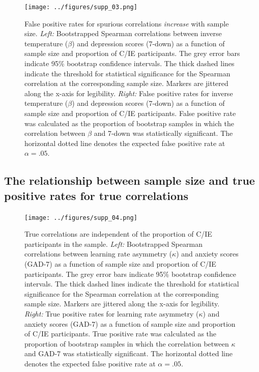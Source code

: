 \documentclass[a4paper,notitlepage,12pt]{article}
\begin{document}
\begin{refsection}[supp]
\begin{figure}[H]
\texttt{[image: ../figures/supp\_03.png]}
\centering
\captionsetup{width=0.88\textwidth}
\caption{False positive rates for spurious correlations \emph{increase} with sample size. \textit{Left:} Bootstrapped Spearman correlations between inverse temperature ($\beta$) and depression scores (7-down) as a function of sample size and proportion of C/IE participants. The grey error bars indicate 95\% bootstrap confidence intervals. The thick dashed lines indicate the threshold for statistical significance for the Spearman correlation at the corresponding sample size. Markers are jittered along the x-axis for legibility. \textit{Right:} False positive rates for inverse temperature ($\beta$) and depression scores (7-down) as a function of sample size and proportion of C/IE participants. False positive rate was calculated as the proportion of bootstrap samples in which the correlation between $\beta$ and 7-down was statistically significant. The horizontal dotted line denotes the expected false positive rate at $\alpha = .05$.}
\label{fig:bootstrap_s1}
\end{figure}

\clearpage

\subsection*{The relationship between sample size and true positive rates for true correlations}

\begin{figure}[H]
\texttt{[image: ../figures/supp\_04.png]}
\centering
\captionsetup{width=0.88\textwidth}
\caption{True correlations are independent of the proportion of C/IE participants in the sample. \textit{Left:} Bootstrapped Spearman correlations between learning rate asymmetry ($\kappa$) and anxiety scores (GAD-7) as a function of sample size and proportion of C/IE participants. The grey error bars indicate 95\% bootstrap confidence intervals. The thick dashed lines indicate the threshold for statistical significance for the Spearman correlation at the corresponding sample size. Markers are jittered along the x-axis for legibility. \textit{Right:} True positive rates for learning rate asymmetry ($\kappa$) and anxiety scores (GAD-7) as a function of sample size and proportion of C/IE participants. True positive rate was calculated as the proportion of bootstrap samples in which the correlation between $\kappa$ and GAD-7 was statistically significant. The horizontal dotted line denotes the expected false positive rate at $\alpha = .05$.}
\label{fig:bootstrap_s2}
\end{figure}


\end{refsection}
\end{document}
